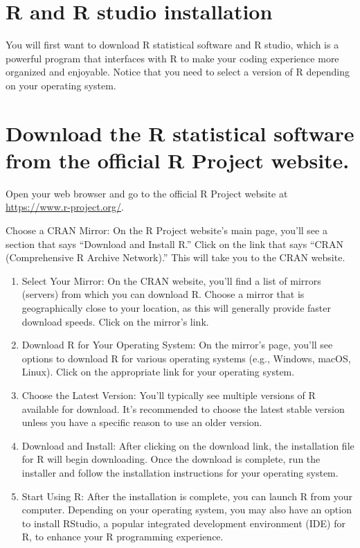 \documentclass[
]{book}
\begin{document}
\hypertarget{r-and-r-studio-installation}{%
\section{R and R studio installation}\label{r-and-r-studio-installation}}

You will first want to download R statistical software and R studio, which is a powerful program that interfaces with R to make your coding experience more organized and enjoyable. Notice that you need to select a version of R depending on your operating system.

\hypertarget{download-the-r-statistical-software-from-the-official-r-project-website.}{%
\section{Download the R statistical software from the official R Project website.}\label{download-the-r-statistical-software-from-the-official-r-project-website.}}

Open your web browser and go to the official R Project website at \url{https://www.r-project.org/}.

Choose a CRAN Mirror: On the R Project website's main page, you'll see a section that says ``Download and Install R.'' Click on the link that says ``CRAN (Comprehensive R Archive Network).'' This will take you to the CRAN website.

\begin{enumerate}
\def\labelenumi{\arabic{enumi}.}
\item
  Select Your Mirror: On the CRAN website, you'll find a list of mirrors (servers) from which you can download R. Choose a mirror that is geographically close to your location, as this will generally provide faster download speeds. Click on the mirror's link.
\item
  Download R for Your Operating System: On the mirror's page, you'll see options to download R for various operating systems (e.g., Windows, macOS, Linux). Click on the appropriate link for your operating system.
\item
  Choose the Latest Version: You'll typically see multiple versions of R available for download. It's recommended to choose the latest stable version unless you have a specific reason to use an older version.
\item
  Download and Install: After clicking on the download link, the installation file for R will begin downloading. Once the download is complete, run the installer and follow the installation instructions for your operating system.
\item
  Start Using R: After the installation is complete, you can launch R from your computer. Depending on your operating system, you may also have an option to install RStudio, a popular integrated development environment (IDE) for R, to enhance your R programming experience.
\end{enumerate}
\end{document}
